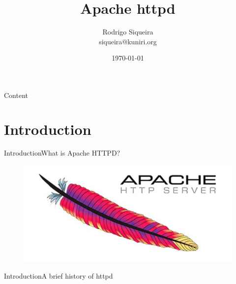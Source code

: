 \documentclass[10pt]{beamer}
\title[] %
{ %
      \textbf{Apache httpd}
}
\subtitle[Managements]
{
}
\author[Rodrigo Siqueira]
{      Rodrigo Siqueira\\
      {\ttfamily siqueira@kuniri.org}
}
\institute[]
{
      Institute of Mathematics and Statistics\\
      University of Sao Paulo\\

}
\date{\today}
\begin{document}

{\1%
\begin{frame}
  \titlepage %
\end{frame}}

\begin{frame}[shrink]{Content}{}
  \tableofcontents
\end{frame}

\section{Introduction}
\begin{frame}{Introduction}{What is Apache HTTPD?}
  \begin{figure}[ht]
    \centering
    \includegraphics[width=1\textwidth, keepaspectratio=true]{images/apachehttpd.jpg}
  \end{figure}
\end{frame}

\begin{frame}{Introduction}{A brief history of httpd}
\end{frame}

\end{document}
